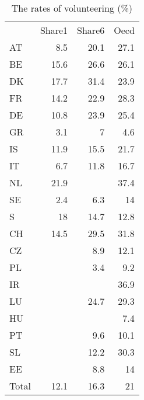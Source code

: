 \begin{table}[htbp]
  \centering
  \caption{The rates of volunteering (\%)}
    \begin{tabular}{lrrr}
          & \multicolumn{1}{l}{Share1} & \multicolumn{1}{l}{Share6} & \multicolumn{1}{l}{Oecd} \\
    AT    & 8.5   & 20.1  & 27.1 \\
    BE    & 15.6  & 26.6  & 26.1 \\
    DK    & 17.7  & 31.4  & 23.9 \\
    FR    & 14.2  & 22.9  & 28.3 \\
    DE    & 10.8  & 23.9  & 25.4 \\
    GR    & 3.1   & 7     & 4.6 \\
    IS    & 11.9  & 15.5  & 21.7 \\
    IT    & 6.7   & 11.8  & 16.7 \\
    NL    & 21.9  &       & 37.4 \\
    SE    & 2.4   & 6.3   & 14 \\
    S     & 18    & 14.7  & 12.8 \\
    CH    & 14.5  & 29.5  & 31.8 \\
    CZ    &       & 8.9   & 12.1 \\
    PL    &       & 3.4   & 9.2 \\
    IR    &       &       & 36.9 \\
    LU    &       & 24.7  & 29.3 \\
    HU    &       &       & 7.4 \\
    PT    &       & 9.6   & 10.1 \\
    SL    &       & 12.2  & 30.3 \\
    EE    &       & 8.8   & 14 \\
    Total & 12.1  & 16.3  & 21 \\
    \end{tabular}%
  \label{tab:addlabel}%
\end{table}%
